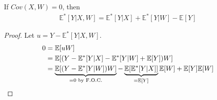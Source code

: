\documentclass[11pt]{elegantbook}
\begin{document}
\begin{lemma}
    If $Cov(X,W)=0$, then
    \begin{equation}
        \begin{aligned}
            \mathbb{E}^*[Y|X,W]=\mathbb{E}^*[Y|X]+\mathbb{E}^*[Y|W]-\mathbb{E}[Y]
        \end{aligned}
        \nonumber
    \end{equation}
\end{lemma}
\begin{proof}
    Let $u=Y-\mathbb{E}^*[Y|X,W]$.
    \begin{equation}
        \begin{aligned}
            0&=\mathbb{E}[uW]\\
            &=\mathbb{E}[(Y-\mathbb{E}^*[Y|X]-\mathbb{E}^*[Y|W]+\mathbb{E}[Y])W]\\
            &=\underbrace{\mathbb{E}[(Y-\mathbb{E}^*[Y|W])W]}_{=0 \textnormal{ by F.O.C.}}-\underbrace{\mathbb{E}[\mathbb{E}^*[Y|X]]}_{=\mathbb{E}[Y]}\mathbb{E}[W]+\mathbb{E}[Y]\mathbb{E}[W]
        \end{aligned}
        \nonumber
    \end{equation}
\end{proof}
\end{document}

